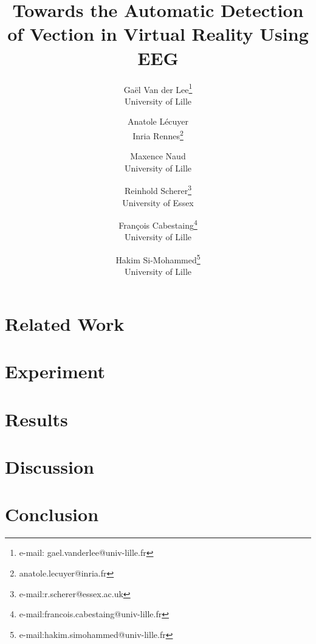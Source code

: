 \documentclass[review,journal]{template_ieee/vgtc}              %
\title{Towards the Automatic Detection of Vection in Virtual Reality Using EEG}
\author{Gaël Van der Lee\thanks{e-mail: gael.vanderlee@univ-lille.fr}\\
    \scriptsize University of Lille
\and Anatole Lécuyer\\
    \scriptsize Inria Rennes\thanks{anatole.lecuyer@inria.fr}
\and Maxence Naud\\
    \scriptsize University of Lille
\and Reinhold Scherer\thanks{e-mail:r.scherer@essex.ac.uk}\\
     \scriptsize University of Essex
\and François Cabestaing\thanks{e-mail:francois.cabestaing@univ-lille.fr}\\
    \scriptsize University of Lille
\and Hakim Si-Mohammed\thanks{e-mail:hakim.simohammed@univ-lille.fr}\\
    \scriptsize University of Lille}
\begin{document}

\maketitle


\section{Related Work}\label{sec:related-works}


\section{Experiment}\label{sec:methods}


\section{Results}\label{sec:results}


\section{Discussion}\label{sec:discussion}


\section{Conclusion}\label{sec:conclusion}


\acknowledgments{}

% 
%
% 

% 


\end{document}
